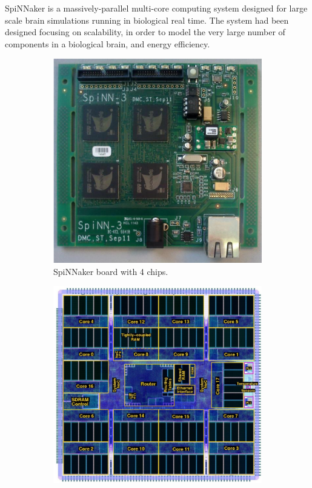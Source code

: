 SpiNNaker is a massively-parallel multi-core computing system designed for large scale brain simulations running in biological real time. The system had been designed focusing on scalability, in order to model the very large number of components in a biological brain, and energy efficiency.

\begin{figure}[ht]
\centering
\begin{subfigure}{0.45\textwidth}
\includegraphics[width=\textwidth]{images/context/spinnaker_board.png} 
\caption{SpiNNaker board with 4 chips.}
\label{fig:spinnaker_board}
\end{subfigure}
\begin{subfigure}{0.45\textwidth}
\includegraphics[width=\textwidth]{images/context/spinnaker_chip.png}

\end{subfigure}
\end{figure}
